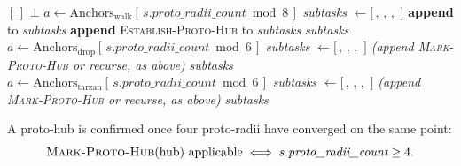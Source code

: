\begin{algorithm}[H]
\caption{Methods for \textsc{Establish-Proto-Hub} (three biologically motivated alternatives, tried in order with backtracking)}
\label{alg:orig-protohub}
\begin{algorithmic}[1]
 
    \State \Return $[\,]$
  \EndIf
  \State \Return $\bot$ 
\EndFunction
\Statex
{} 
  \State $a \gets \mathrm{Anchors}_{\mathrm{walk}}[\,s.\textit{proto\_radii\_count} \bmod 8\,]$
  \State \textit{subtasks} $\gets [\,$, ,\newline
    \hspace*{108.5pt}, $\,]$
    \State \textbf{append}  to \textit{subtasks}
  \Else
    \State \textbf{append} \textsc{Establish-Proto-Hub} to \textit{subtasks} 
  \EndIf
  \State \Return \textit{subtasks}
\EndFunction
\Statex
{} 
  \State $a \gets \mathrm{Anchors}_{\mathrm{drop}}[\,s.\textit{proto\_radii\_count} \bmod 6\,]$
  \State \textit{subtasks} $\gets [\,$, ,\newline
    \hspace*{108.5pt}, $\,]$
  \State \textit{(append \textsc{Mark-Proto-Hub} or recurse, as above)}
  \State \Return \textit{subtasks}
\EndFunction
\Statex
{} 
  \State $a \gets \mathrm{Anchors}_{\mathrm{tarzan}}[\,s.\textit{proto\_radii\_count} \bmod 6\,]$
  \State \textit{subtasks} $\gets [\,$, ,\newline
    \hspace*{108.5pt}, $\,]$
  \State \textit{(append \textsc{Mark-Proto-Hub} or recurse, as above)}
  \State \Return \textit{subtasks}
\EndFunction
\end{algorithmic}
\end{algorithm}

A proto-hub is confirmed once four proto-radii have converged on the same point:
\[
  \textsc{Mark-Proto-Hub}(\text{hub}) \text{ applicable} \iff s.\textit{proto\_radii\_count} \geq 4.
\]

